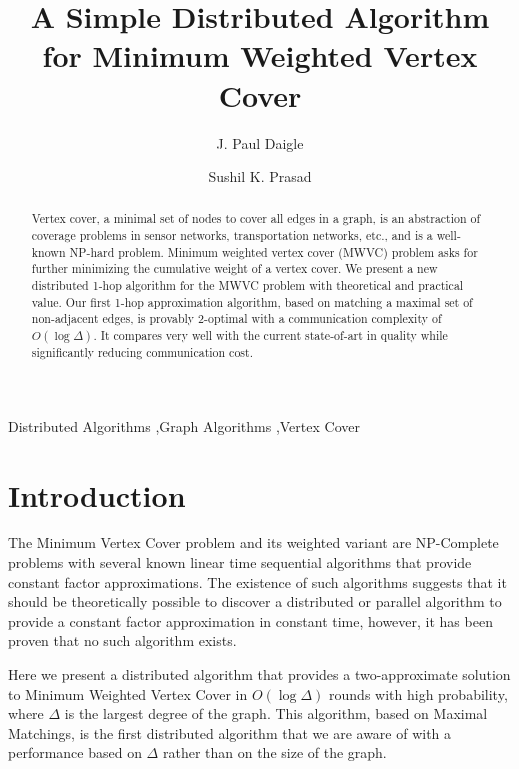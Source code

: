 \documentclass[review ]{elsarticle}
\begin{document}
\title{A Simple Distributed Algorithm for Minimum Weighted Vertex Cover}
\author[gsu]{J. Paul Daigle}
\author[gsu]{Sushil K. Prasad}
\address[gsu]{Department of Computer Science, Georgia State University, P.O. Box 3994, Atlanta, GA  30302-3994}
\begin{abstract} Vertex cover, a minimal set of nodes to cover all edges in a graph, is an abstraction of coverage problems in sensor networks, transportation networks, etc., and is a well-known NP-hard problem.  Minimum weighted vertex cover (MWVC) problem asks for further minimizing the cumulative weight of a vertex cover.  We present a new distributed 1-hop algorithm for the MWVC problem with theoretical and practical value.  Our first 1-hop approximation algorithm, based on matching a maximal set of non-adjacent edges, is provably 2-optimal with a communication complexity of $O(\log\Delta)$.   It compares very well with the current state-of-art in quality while significantly reducing communication cost.
\end{abstract}

\begin{keyword}Distributed Algorithms \sep Graph Algorithms \sep Vertex Cover \end{keyword}
\maketitle

\section{Introduction}

The Minimum Vertex Cover problem and its weighted variant are NP-Complete problems with several known linear time sequential algorithms that provide constant factor approximations. The existence of such algorithms suggests that it should be theoretically possible to discover a distributed or parallel algorithm to provide a constant factor approximation in constant time, however, it has been proven that no such algorithm exists\cite{1011811}. 

Here we present a distributed algorithm that provides a two-approximate solution to Minimum Weighted Vertex Cover in $O(\log\Delta)$ rounds with high probability, where $\Delta$ is the largest degree of the graph. This algorithm, based on Maximal Matchings, is the first distributed algorithm that we are aware of with a performance based on $\Delta$ rather than on the size of the graph. 
\end{document}

